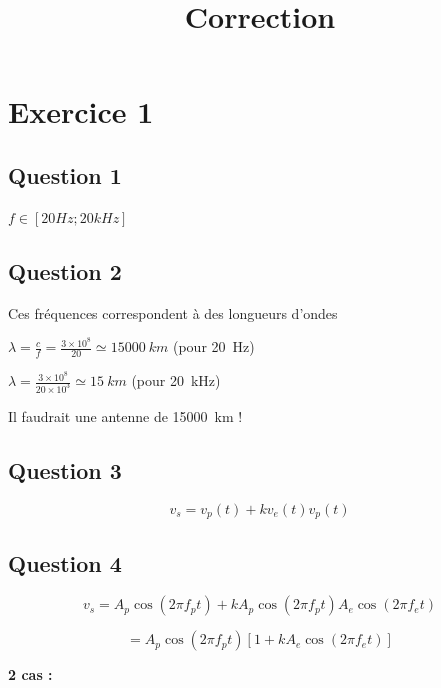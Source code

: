 \documentclass{article}
\title{Correction}
\author{}
\date{}
\begin{document}
\maketitle

\section*{Exercice 1}

\subsection*{Question 1}
    $f\in [20 Hz ; 20 kHz]$

\subsection{Question 2}
Ces fréquences correspondent à des longueurs d'ondes

$\lambda = \frac{c}{f} = \frac{3 \times 10^8}{20} \simeq \SI{15000}{km}$ (pour \SI{20}{Hz})

$\lambda = \frac{3 \times 10^8}{20 \times 10^3} \simeq \SI{15}{km}$ (pour \SI{20}{kHz})

Il faudrait une antenne de \SI{15000}{km} !

\subsection*{Question 3}

$$v_s = v_p(t) + k v_e(t) v_p(t)$$

\subsection*{Question 4}

$$v_s = A_p \cos(2\pi f_p t) + k A_p \cos(2\pi f_p t) A_e \cos(2\pi f_e t)$$

$$= A_p \cos(2\pi f_p t) \left[1 + k A_e \cos(2\pi f_e t)\right]$$

\textbf{2 cas :}
\end{document}

